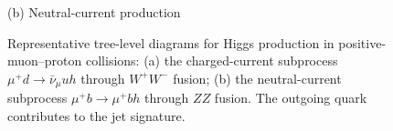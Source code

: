 \begin{figure}[htbp]
\begin{minipage}[t]{0.48\textwidth}
\smallskip
{\small (b) Neutral-current production}
\end{minipage}

\caption{Representative tree-level diagrams for Higgs production
in positive-muon--proton collisions:
(a) the charged-current subprocess
$\mu^+d\to\bar\nu_\mu uh$ through $W^+W^-$ fusion;
(b) the neutral-current subprocess
$\mu^+b\to\mu^+bh$ through $ZZ$ fusion.
The outgoing
quark contributes to the jet signature. }
\label{fig:higgs-production}
\end{figure}
